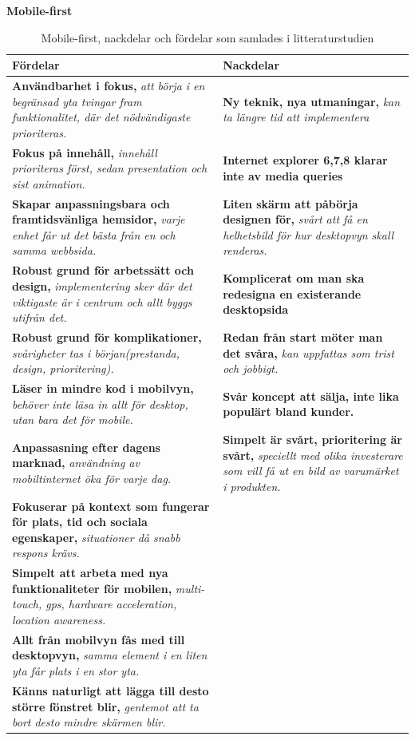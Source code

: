 \documentclass[11pt]{article}
\begin{document}
\textbf{Mobile-first}
\begin{table}[H]
\centering
\begin{tabular}{|p{7.2cm}|p{7.2cm}|}
\hline
Fördelar&Nackdelar\\ \hline
\textbf{Användbarhet i fokus, }\textit{att börja i en begränsad yta tvingar fram funktionalitet, där det nödvändigaste prioriteras.}&\textbf{Ny teknik, nya utmaningar,} \textit{kan ta längre tid att implementera}\\ \hline
\textbf{Fokus på innehåll, }\textit{innehåll prioriteras först, sedan presentation och sist animation.}&\textbf{Internet explorer 6,7,8 klarar inte av media queries} \\ \hline
\textbf{Skapar anpassningsbara och framtidsvänliga hemsidor, }\textit{varje enhet får ut det bästa från en och samma webbsida.}&\textbf{Liten skärm att påbörja designen för, } \textit{svårt att få en helhetsbild för hur desktopvyn skall renderas.}\\ \hline
\textbf{Robust grund för arbetssätt och design, }\textit{implementering sker där det viktigaste är i centrum och allt byggs utifrån det.}&\textbf{Komplicerat om man ska redesigna en existerande desktopsida}\\ \hline
\textbf{Robust grund för komplikationer, }\textit{svårigheter tas i början(prestanda, design, prioritering).}&\textbf{Redan från start möter man det svåra, } \textit{kan uppfattas som trist och jobbigt.}\\ \hline
\textbf{Läser in mindre kod i mobilvyn, }\textit{behöver inte läsa in allt för desktop, utan bara det för mobile.}&\textbf{Svår koncept att sälja, inte lika populärt bland kunder.}\\ \hline
\textbf{Anpassasning efter dagens marknad, }\textit{användning av mobiltinternet öka för varje dag.}&\textbf{Simpelt är svårt, prioritering är svårt, } \textit{speciellt med olika investerare som vill få ut en bild av varumärket i produkten.}\\ \hline
\textbf{Fokuserar på kontext som fungerar för plats, tid och sociala egenskaper, }\textit{situationer då snabb respons krävs.}&~\\ \hline
\textbf{Simpelt att arbeta med nya funktionaliteter för mobilen, }\textit{multi-touch, gps, hardware acceleration, location awareness.}&~\\ \hline
\textbf{Allt från mobilvyn fås med till desktopvyn, }\textit{samma element i en liten yta får plats i en stor yta.}&~\\ \hline
\textbf{Känns naturligt att lägga till desto större fönstret blir, }\textit{gentemot att ta bort desto mindre skärmen blir.}&~\\ \hline

    \end{tabular}
    \caption {Mobile-first, nackdelar och fördelar som samlades i litteraturstudien}
\end{table}
\newpage
\end{document}
